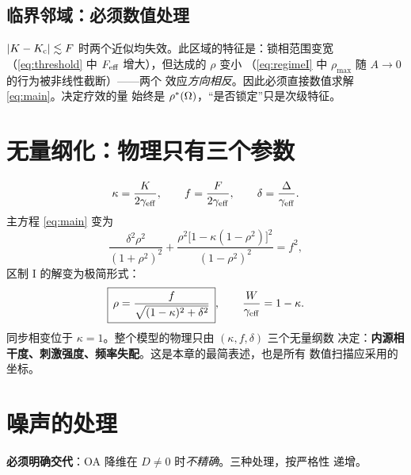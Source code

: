 \subsection{临界邻域：必须数值处理}
\label{sec:critical}

\begin{remark}\label{rem:nocritdiv}
$|K-K_{\mathrm{c}}|\lesssim F$ 时两个近似均失效。此区域的特征是：锁相范围变宽
（\cref{eq:threshold} 中 $F_{\mathrm{eff}}$ 增大），但达成的 $\rho$ 变小
（\cref{eq:regimeI} 中 $\rho_{\max}$ 随 $A\to0$ 的行为被非线性截断）——两个
效应\emph{方向相反}。因此必须直接数值求解 \cref{eq:main}。决定疗效的量
始终是 $\rho^{*}(\Omega)$，“是否锁定”只是次级特征。
\end{remark}

\section{无量纲化：物理只有三个参数}
\label{sec:nondim}

\begin{equation}\label{eq:nondim}
\kappa=\frac{K}{2\gamma_{\mathrm{eff}}},
\qquad
f=\frac{F}{2\gamma_{\mathrm{eff}}},
\qquad
\delta=\frac{\Delta}{\gamma_{\mathrm{eff}}} .
\end{equation}
%
主方程 \cref{eq:main} 变为
%
\begin{equation}\label{eq:nondimmain}
\frac{\delta^2\rho^2}{(1+\rho^2)^2}
+\frac{\rho^2\bigl[1-\kappa(1-\rho^2)\bigr]^2}{(1-\rho^2)^2}=f^2 ,
\end{equation}
%
区制 I 的解变为极简形式：
%
\begin{equation}\label{eq:nondimI}
\boxed{\,\rho=\frac{f}{\sqrt{(1-\kappa)^2+\delta^2}}\,},
\qquad
\frac{W}{\gamma_{\mathrm{eff}}}=1-\kappa .
\end{equation}
%
同步相变位于 $\kappa=1$。整个模型的物理只由 $(\kappa,f,\delta)$ 三个无量纲数
决定：\textbf{内源相干度、刺激强度、频率失配}。这是本章的最简表述，也是所有
数值扫描应采用的坐标。

\section{噪声的处理}
\label{sec:noise}

\textbf{必须明确交代}：OA 降维在 $D\neq0$ 时\emph{不精确}。三种处理，按严格性
递增。

